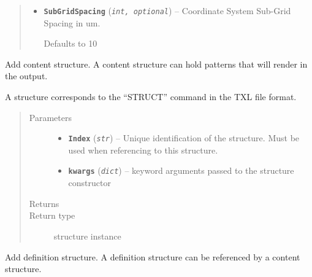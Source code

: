 \documentclass[letterpaper,10pt,english]{sphinxmanual}
\begin{document}
\begin{fulllineitems}
\begin{quote}
\begin{description}
\begin{itemize}
\item {} 
\textbf{\texttt{SubGridSpacing}} (\emph{\texttt{int, optional}}) -- 
Coordinate System Sub-Grid Spacing in um.

Defaults to 10


\end{itemize}

\end{description}\end{quote}

\begin{fulllineitems}
\label{Chapters/40_PythonModuleReference:TXLWizard.TXLWriter.TXLWriter.AddContentStructure}
Add content structure. A content structure can hold patterns that will render in the output.

A structure corresponds to the ``STRUCT'' command in the TXL file format.
\begin{quote}\begin{description}
\item[{Parameters}] \leavevmode\begin{itemize}
\item {} 
\textbf{\texttt{Index}} (\emph{\texttt{str}}) -- Unique identification of the structure. Must be used when referencing to this structure.

\item {} 
\textbf{\texttt{kwargs}} (\emph{\texttt{dict}}) -- keyword arguments passed to the structure constructor

\end{itemize}

\item[{Returns}] \leavevmode


\item[{Return type}] \leavevmode
{} structure instance

\end{description}\end{quote}

\end{fulllineitems}


\begin{fulllineitems}
\label{Chapters/40_PythonModuleReference:TXLWizard.TXLWriter.TXLWriter.AddDefinitionStructure}
Add definition structure. A definition structure can be referenced by a content structure.


\end{fulllineitems}
\end{fulllineitems}
\end{document}
